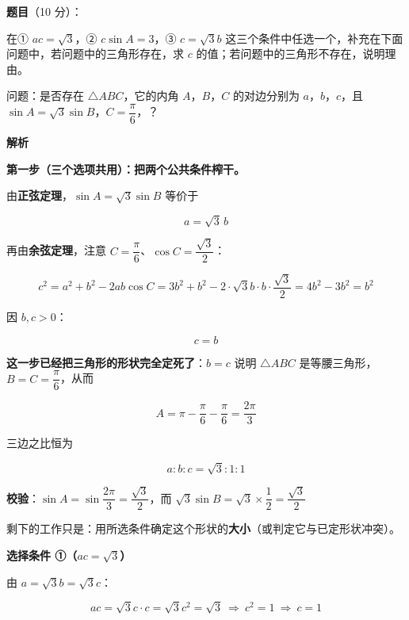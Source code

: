 \begin{answer}

\textbf{题目}（10 分）：

在① $ac=\sqrt3$，② $c\sin A=3$，③ $c=\sqrt3b$ 这三个条件中任选一个，补充在下面问题中，若问题中的三角形存在，求 $c$ 的值；若问题中的三角形不存在，说明理由。

问题：是否存在 $\triangle ABC$，它的内角 $A$，$B$，$C$ 的对边分别为 $a$，$b$，$c$，且 $\sin A=\sqrt3\sin B$，$C=\dfrac\pi6$，\gkblank{}？

\textbf{解析}

\par\medskip

\textbf{第一步（三个选项共用）：把两个公共条件榨干。}

由\textbf{正弦定理}，$\sin A=\sqrt3\sin B$ 等价于

\nopagebreak[4]
\[a=\sqrt3\,b\]

再由\textbf{余弦定理}，注意 $C=\dfrac\pi6$、$\cos C=\dfrac{\sqrt3}2$：

\nopagebreak[4]
\[c^{2}=a^{2}+b^{2}-2ab\cos C=3b^{2}+b^{2}-2\cdot\sqrt3b\cdot b\cdot\frac{\sqrt3}2=4b^{2}-3b^{2}=b^{2}\]

因 $b,c>0$：

\nopagebreak[4]
\[\boxed{c=b}\]

\textbf{这一步已经把三角形的形状完全定死了}：$b=c$ 说明 $\triangle ABC$ 是等腰三角形，$B=C=\dfrac\pi6$，从而

\nopagebreak[4]
\[A=\pi-\frac\pi6-\frac\pi6=\frac{2\pi}3\]

三边之比恒为

\nopagebreak[4]
\[a:b:c=\sqrt3:1:1\]

\textbf{校验}：$\sin A=\sin\dfrac{2\pi}3=\dfrac{\sqrt3}2$，而 $\sqrt3\sin B=\sqrt3\times\dfrac12=\dfrac{\sqrt3}2$ 

剩下的工作只是：用所选条件确定这个形状的\textbf{大小}（或判定它与已定形状冲突）。

\par\medskip

\textbf{选择条件 ①（$ac=\sqrt3$）}

由 $a=\sqrt3b=\sqrt3c$：

\nopagebreak[4]
\[ac=\sqrt3c\cdot c=\sqrt3c^{2}=\sqrt3\ \Longrightarrow\ c^{2}=1\ \Longrightarrow\ c=1\]


\end{answer}
